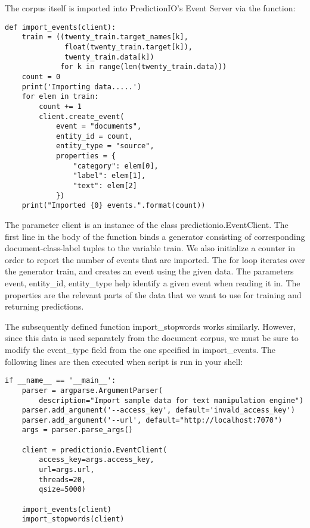 \documentclass[a4paper,12pt]{article}
\newcommand{\3}{\left}
\newcommand{\4}{\right}
\renewcommand{\-}[1]{{}^{-#1}}
\begin{document}
The corpus itself is imported into PredictionIO's Event Server via the function:

\begin{verbatim}
def import_events(client):
    train = ((twenty_train.target_names[k],
              float(twenty_train.target[k]),
              twenty_train.data[k])
             for k in range(len(twenty_train.data)))
    count = 0
    print('Importing data.....')
    for elem in train:
        count += 1
        client.create_event(
            event = "documents",
            entity_id = count,
            entity_type = "source",
            properties = {
                "category": elem[0],
                "label": elem[1],
                "text": elem[2]
            })
    print("Imported {0} events.".format(count))
\end{verbatim}

The parameter client is an instance of the class predictionio.EventClient. The first line in the body of the function binds a generator consisting of corresponding document-class-label tuples to the variable train. We also initialize a counter in order to report the number of events that are imported. The for loop iterates over the generator train, and creates an event using the given data. The parameters event, entity\_id, entity\_type help identify a given event when reading it in. The properties are the relevant parts of the data that we want to use for training and returning predictions.

The subsequently defined function import\_stopwords works similarly. However, since this data is used separately from the document corpus, we must be sure to modify the event\_type field from the one specified in import\_events. The following lines are then executed when script is run in your shell:

\begin{verbatim}
if __name__ == '__main__':
    parser = argparse.ArgumentParser(
        description="Import sample data for text manipulation engine")
    parser.add_argument('--access_key', default='invald_access_key')
    parser.add_argument('--url', default="http://localhost:7070")
    args = parser.parse_args()

    client = predictionio.EventClient(
        access_key=args.access_key,
        url=args.url,
        threads=20,
        qsize=5000)

    import_events(client)
    import_stopwords(client)
\end{verbatim}
\end{document}
